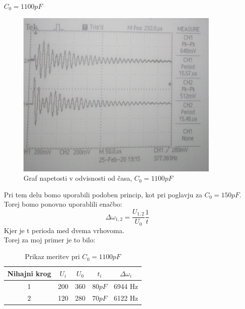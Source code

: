 \documentclass[11pt, a4paper]{article}
\theoremstyle{definition}
\theoremstyle{example}
\theoremstyle{izrek}
\begin{document}
\pagebreak
\textbf{\underline{$C_0=1100pF$}}\\

\begin{figure}[htp]
    \centering
    \includegraphics[width=10cm]{C=1100.jpg}
    \caption{Graf napetosti v odvisnosti od časa, $C_0=1100 pF$}
\end{figure}

Pri tem delu bomo uporabili podoben princip, kot pri poglavju za $C_0=150pF$. Torej bomo ponovno uporablili enačbo:
$$\Delta \omega_{1,2}=\frac{U_{1,2}}{U_0}\frac{1}{t} $$
Kjer je t perioda med dvema vrhovoma.\\
Torej za moj primer je to bilo: \\
\begin{table}[ht]
	\centering
	\begin{tabular}{|c|c|c|c|c|}
		\hline
		Nihajni krog & $U_i$ & $U_0$ & $ t_i$ & $\Delta \omega_i$ \\
		\hline
		\hline
		1 & 200 & 360 & 80$pF$ & 6944 Hz \\
		\hline
		2 & 120 & 280 & 70$pF$ & 6122 Hz \\
		\hline
		\end{tabular}
		\caption{Prikaz meritev pri $C_0=1100pF$}
		\label{tab:FirstTable}
\end{table}

\pagebreak
\end{document}
